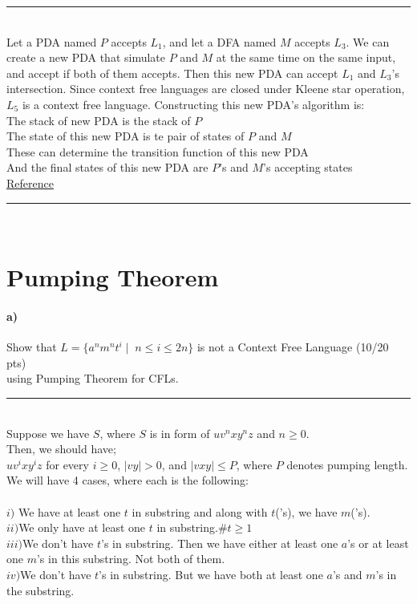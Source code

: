 \documentclass[a4paper,12pt]{article}
\newcommand{\HRule}{\rule{\linewidth}{1mm}}
\begin{document}
\HRule\\
Let a PDA named $P$ accepts $L_1$, and let a DFA named $M$ accepts $L_3$. We can create a new PDA that simulate $P$ and $M$ at the same time on the same input, and accept if both of them accepts. Then this new PDA can accept $L_1$ and $L_3$'s intersection. Since context free languages are closed under Kleene star operation, $L_5$ is a context free language. Constructing this new PDA's algorithm is:\\
The stack of new PDA is the stack of $P$\\
The state of this new PDA is te pair of states of $P$ and $M$ \\
These can determine the transition function of this new PDA \\
And the final states of this new PDA are $P$'s and $M$'s accepting states \\
\href{https://courses.engr.illinois.edu/cs373/fa2010/Lectures/notes25.pdf}{Reference} \\
\HRule\\

\newpage
\section{Pumping Theorem \hfill {}}

\paragraph{a)} Show that $L=\{a^n m^n t^i \mid \; n\leq i \leq 2n\}$ is not a Context Free Language \hfill \small{(10/20 pts)} \\
using Pumping Theorem for CFLs. \\

\HRule\\
Suppose we have $S$, where $S$ is in form of $uv^nxy^nz$ and $n \geq 0$.\\
Then, we should have;\\
$uv^ixy^iz$ for every $i \geq 0$, $|vy| > 0$, and $|vxy| \leq P$, where $P$ denotes pumping length.\\
We will have 4 cases, where each is the following:\\\\
$i)$ We have at least one $t$ in substring and along with $t$('s), we have $m$('s).\\
$ii)$We only have at least one $t$ in substring.$\#t \geq 1$ \\
$iii)$We don't have $t$'s in substring. Then we have either at least one $a$'s or at least one $m$'s in this substring. Not both of them.\\
$iv)$We don't have $t$'s in substring. But we have both at least one $a$'s and $m$'s in the substring.\\
\\
\end{document}
